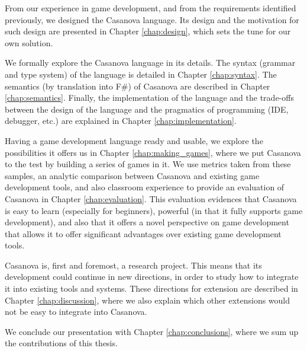 From our experience in game development, and from the requirements identified previously, we designed the Casanova language. Its design and the motivation for such design are presented in Chapter \ref{chap:design}, which sets the tune for our own solution.

We formally explore the Casanova language in its details. The syntax (grammar and type system) of the language is detailed in Chapter \ref{chap:syntax}. The semantics (by translation into F\#) of Casanova are described in Chapter \ref{chap:semantics}. Finally, the implementation of the language and the trade-offs between the design of the language and the pragmatics of programming (IDE, debugger, etc.) are explained in Chapter \ref{chap:implementation}.

Having a game development language ready and usable, we explore the possibilities it offers us in Chapter \ref{chap:making_games}, where we put Casanova to the test by building a series of games in it. We use metrics taken from these samples, an analytic comparison between Casanova and existing game development tools, and also classroom experience to provide an evaluation of Casanova in Chapter \ref{chap:evaluation}. This evaluation evidences that Casanova is easy to learn (especially for beginners), powerful (in that it fully supports game development), and also that it offers a novel perspective on game development that allows it to offer significant advantages over existing game development tools.

Casanova is, first and foremost, a research project. This means that its development could continue in new directions, in order to study how to integrate it into existing tools and systems. These directions for extension are described in Chapter \ref{chap:discussion}, where we also explain which other extensions would not be easy to integrate into Casanova.

We conclude our presentation with Chapter \ref{chap:conclusions}, where we sum up the contributions of this thesis.
